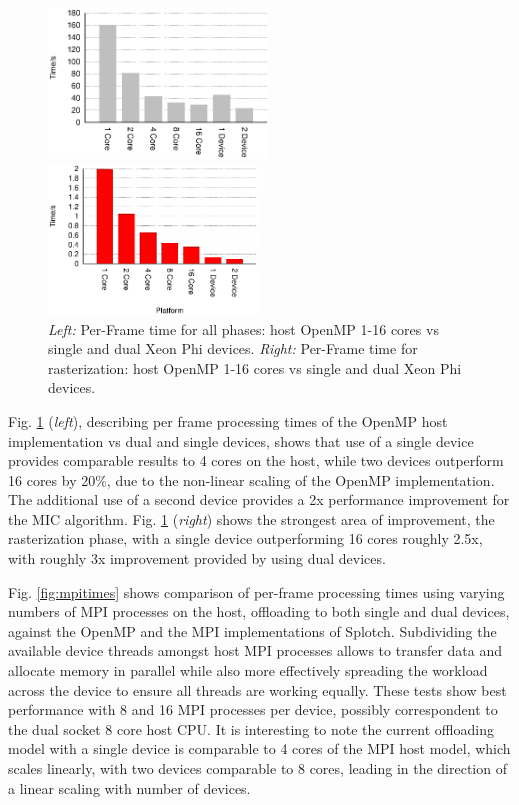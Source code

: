 \documentclass[runningheads,a4paper]{llncs}
\begin{document}
\begin{figure}
\centering
\begin{minipage}[t]{.45\textwidth}
  \centering
  \includegraphics[height=4.0cm]{TotalTime}
\end{minipage}
\begin{minipage}[t]{.45\textwidth}
  \centering
  \includegraphics[height=4.0cm]{Rotocol}
\end{minipage}
\caption{\emph{Left:} Per-Frame time for all phases: host OpenMP 1-16 cores vs single and dual Xeon Phi devices.
\emph{Right:} Per-Frame time for rasterization: host OpenMP 1-16 cores vs single and dual Xeon Phi devices.}
\label{fig:timings}
\end{figure}

Fig. \ref{fig:timings} (\emph{left}), describing per frame processing times of the OpenMP host implementation vs dual and single devices, 
shows that use of a single device provides comparable results to 4 cores on the host, while two devices outperform 16 cores by 20\%, due to the 
non-linear scaling of the OpenMP implementation. The additional use of a second device provides a 2x performance improvement for the 
MIC algorithm. Fig. \ref{fig:timings} (\emph{right}) shows the strongest area of improvement, the rasterization phase, with a single 
device outperforming 16 cores roughly 2.5x, with roughly 3x improvement provided by using dual devices. 

Fig. \ref{fig:mpitimes} shows comparison of per-frame processing times using varying numbers of MPI processes on the host, offloading to 
both single and dual devices, against the OpenMP and the MPI implementations of Splotch. Subdividing the available device threads 
amongst host MPI processes allows to transfer data and allocate memory in parallel while also more effectively spreading the 
workload across the device to ensure all threads are working equally. These tests show best performance with 8 and 16 MPI 
processes per device, possibly correspondent to the dual socket 8 core host CPU. It is interesting to note the current offloading model 
with a single device is comparable to 4 cores of the MPI host model, which scales linearly, with two devices comparable to 8 cores, leading 
in the direction of a linear scaling with number of devices.
\end{document}

